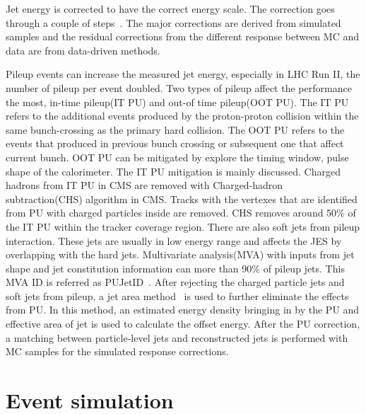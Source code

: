 Jet energy is corrected to have the correct energy scale.  The correction goes through a couple of steps~\cite{jetenergycorrection}. The major corrections are derived from simulated samples and the residual corrections from the different response between MC and data are from data-driven methods. 

Pileup events can increase the measured jet energy, especially in LHC Run II, the number of pileup per event doubled. Two types of pileup affect the performance the most, in-time pileup(IT PU) and out-of time pileup(OOT PU). The IT PU refers to the additional events produced by the proton-proton collision within the same bunch-crossing as the primary hard collision.   The OOT PU refers to the events that produced in previous bunch crossing or subsequent one that affect current bunch. OOT PU can be mitigated by explore the timing window, pulse shape of the calorimeter. The IT PU mitigation is mainly discussed. Charged hadrons from IT PU in CMS are removed with Charged-hadron subtraction(CHS) algorithm in CMS. Tracks with the vertexes that are identified from PU with charged particles inside are removed. CHS removes around 50\% of the IT PU within the tracker coverage region. There are also soft jets from pileup interaction. These jets are usually in low energy range and affects the JES by overlapping with the hard jets. Multivariate analysis(MVA) with inputs from jet shape and jet constitution information can more than 90\% of pileup jets. This MVA ID is referred as PUJetID~\cite{PU_jetID}. After rejecting the charged particle jets and soft jets from pileup, a jet area method~\cite{FastJetalso} is used to further eliminate the effects from PU. In this method, an estimated energy density bringing in by the PU and effective area of jet is used to calculate the offset energy. After the PU correction, a matching between particle-level jets and reconstructed jets is performed with MC samples for the simulated response corrections. 









\section{Event simulation}

